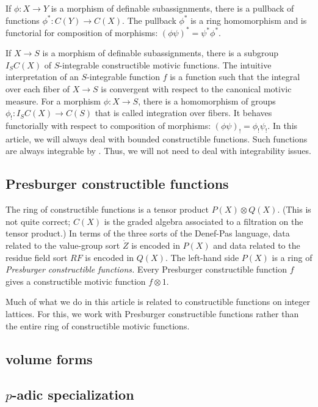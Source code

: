 If $\phi:X\to Y$ is a morphism of definable subassignments, there is a pullback of functions $\phi^*:C(Y)\to C(X)$.  The
pullback $\phi^*$ is a ring homomorphism and is functorial for composition of morphisms: $(\phi\psi)^* = \psi^* \phi^*$.

If $X\to S$ is a morphism of definable subassignments, there is  a subgroup $I_S C(X)$ of $S$-integrable constructible motivic functions.
The intuitive interpretation of an $S$-integrable function $f$ is a function such that the integral over each fiber of $X\to S$ 
is convergent with respect to the canonical motivic measure.  For a morphism $\phi: X\to S$, there is a 
homomorphism of groups $\phi_!:I_SC(X)\to C(S)$ that is called integration over fibers.  It behaves functorially with
respect to composition of morphisms: $(\phi\psi)_! = \phi_!\psi_!$.
In this article, we will always deal with bounded constructible functions.  Such functions are always integrable by \cite{XX}.
Thus, we will not need to deal with integrability issues.

\subsection{Presburger constructible functions}

The ring of constructible functions is a tensor product $P(X) \otimes Q(X)$.  (This is not quite correct; $C(X)$ is the graded
algebra associated to a filtration on the tensor product.)  In terms of the three sorts of the Denef-Pas language,
data related to the value-group sort $\ring{Z}$ is encoded in $P(X)$ and data related to the residue field sort $RF$ is encoded
in $Q(X)$.  The left-hand side $P(X)$ is a ring of {\it Presburger
constructible functions.}  Every Presburger constructible function $f$ gives a constructible motivic function $f\otimes 1$.

Much of what we do in this article is related to constructible functions on integer lattices.  For this, we work with Presburger
constructible functions rather than the entire ring of constructible motivic functions.

\subsection{volume forms}


\subsection{$p$-adic specialization}

